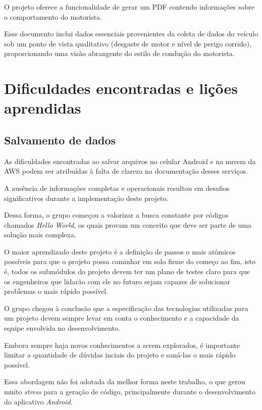 O projeto oferece a funcionalidade de gerar um PDF contendo informações sobre o comportamento do motorista. 

Esse documento inclui dados essenciais provenientes da coleta de dados do veículo sob um ponto de vista qualitativo (desgaste de motor e nível de perigo corrido), proporcionando uma visão abrangente do estilo de condução do motorista.

\section{Dificuldades encontradas e lições aprendidas}

\subsection{Salvamento de dados}
    
    As dificuldades encontradas ao salvar arquivos no celular Android e na nuvem da AWS podem ser atribuídas à falta de clareza na documentação desses serviços.
    
    A ausência de informações completas e operacionais resultou em desafios significativos durante a implementação deste projeto.
    
    Dessa forma, o grupo começou a valorizar a busca constante por códigos chamados \textit{Hello World}, os quais provam um conceito que deve ser parte de uma solução mais complexa.
    
    O maior aprendizado deste projeto é a definição de passos o mais atômicos possíveis para que o projeto possa caminhar em solo firme do começo ao fim, isto é, todos os submódulos do projeto devem ter um plano de testes claro para que os engenheiros que lidarão com ele no futuro sejam capazes de solucionar problemas o mais rápido possível.

    O grupo chegou à conclusão que a especificação das tecnologias utilizadas para um projeto devem sempre levar em conta o conhecimento e a capacidade da equipe envolvida no desenvolvimento.

    Embora sempre haja novos conhecimentos a serem explorados, é importante limitar a quantidade de dúvidas inciais do projeto e saná-las o mais rápido possível.

    Essa abordagem não foi adotada da melhor forma neste trabalho, o que gerou muito \textit{stress} para a geração de código, principalmente durante o desenvolvimento do aplicativo \textit{Android}.

